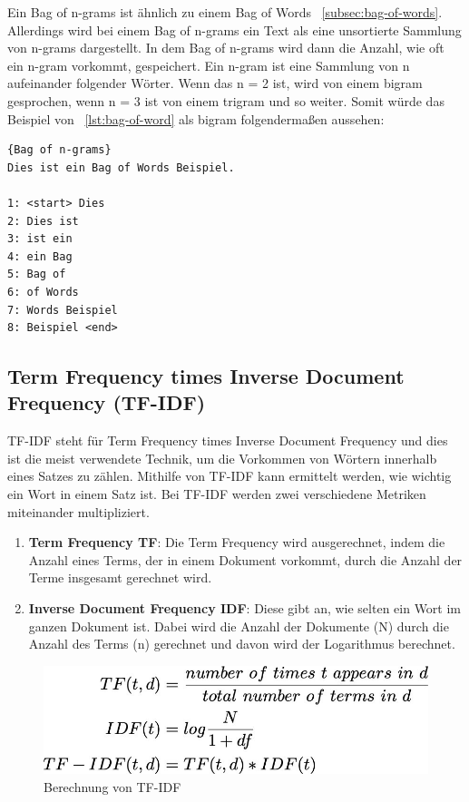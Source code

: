Ein Bag of n-grams ist ähnlich zu einem Bag of Words ~\ref{subsec:bag-of-words}.
Allerdings wird bei einem Bag of n-grams ein Text als eine unsortierte Sammlung von n-grams dargestellt.
In dem Bag of n-grams wird dann die Anzahl, wie oft ein n-gram vorkommt, gespeichert.
Ein n-gram ist eine Sammlung von n aufeinander folgender Wörter.
Wenn das n = 2 ist, wird von einem bigram gesprochen, wenn n = 3 ist von einem trigram und so weiter.
Somit würde das Beispiel von ~\ref{lst:bag-of-word} als bigram folgendermaßen aussehen:

\begin{lstlisting}[label={lst:bag-of-n-grams},caption={Bag of n-grams}]{Bag of n-grams}
Dies ist ein Bag of Words Beispiel.

1: <start> Dies
2: Dies ist
3: ist ein
4: ein Bag
5: Bag of
6: of Words
7: Words Beispiel
8: Beispiel <end>
\end{lstlisting}

\subsection{Term Frequency times Inverse Document Frequency (TF-IDF)}\label{subsec:tf-idf}

TF-IDF steht für Term Frequency times Inverse Document Frequency und dies ist die meist verwendete Technik, um die Vorkommen von Wörtern innerhalb eines Satzes zu zählen.
Mithilfe von TF-IDF kann ermittelt werden, wie wichtig ein Wort in einem Satz ist.
Bei TF-IDF werden zwei verschiedene Metriken miteinander multipliziert.\cite{tfIdf}

\begin{enumerate}
    \item \textbf{Term Frequency TF}: Die Term Frequency wird ausgerechnet, indem die Anzahl eines Terms, der in einem Dokument vorkommt, durch die Anzahl der Terme insgesamt gerechnet wird.
    \item \textbf{Inverse Document Frequency IDF}: Diese gibt an, wie selten ein Wort im ganzen Dokument ist.
    Dabei wird die Anzahl der Dokumente (N) durch die Anzahl des Terms (n) gerechnet und davon wird der Logarithmus berechnet.
\end{enumerate}

\begin{figure}[hbt!]
    \centering
    \includegraphics[scale=0.5]{pics/tf_idf}
    \caption{Berechnung von TF-IDF~\cite{tfIdfImage}}
    \label{fig:tf-idf}
\end{figure}

